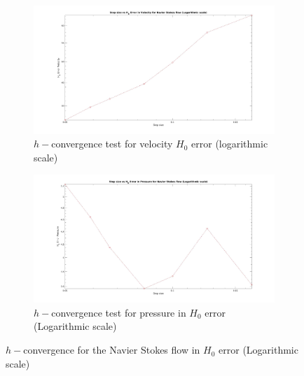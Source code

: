 \documentclass[a4paper,twoside,openright]{book}
\begin{document}
\begin{figure}
\begin{subfigure}{\textwidth}	
  \includegraphics[width=\linewidth]{H0_convergence_velocity_n_s_log.jpg}
  \caption{$h-$convergence test for velocity $H_0$ error (logarithmic scale)}
  \label{fig:vel_navier_stoke_conv_log_h0}
\end{subfigure}
\begin{subfigure}{\textwidth}	
  \includegraphics[width=\linewidth]{H0_convergence_pressure_n_s_log.jpg}
  \caption{$h-$convergence test for pressure in $H_0$ error (Logarithmic scale)}
  \label{fig:pre_navier_stoke_conv_log_h0}
\end{subfigure}
\caption{$h-$convergence for the Navier Stokes flow in $H_0$ error (Logarithmic scale)}
\label{navier_stoke_conv_h0_log}
\end{figure}
\end{document}
